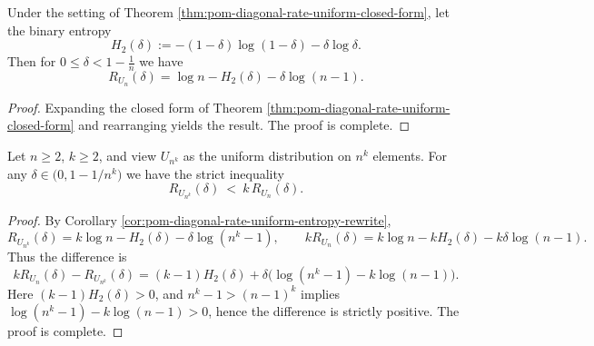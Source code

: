 \begin{corollary}\label{cor:pom-diagonal-rate-uniform-entropy-rewrite}
Under the setting of Theorem \ref{thm:pom-diagonal-rate-uniform-closed-form}, let the binary entropy
\[
H_2(\delta):=-(1-\delta)\log(1-\delta)-\delta\log\delta.
\]
Then for \(0\le\delta<1-\tfrac1n\) we have
\[
R_{U_n}(\delta)=\log n-H_2(\delta)-\delta\log(n-1).
\]
\end{corollary}
\begin{proof}
Expanding the closed form of Theorem \ref{thm:pom-diagonal-rate-uniform-closed-form} and rearranging yields the result. The proof is complete.
\end{proof}

\begin{theorem}\label{thm:pom-diagonal-rate-uniform-synergy-inequality}
Let \(n\ge 2\), \(k\ge 2\), and view \(U_{n^k}\) as the uniform distribution on \(n^k\) elements.
For any \(\delta\in\bigl(0,1-1/n^k\bigr)\) we have the strict inequality
\[
R_{U_{n^k}}(\delta)\ <\ k\,R_{U_n}(\delta).
\]
\end{theorem}
\begin{proof}
By Corollary \ref{cor:pom-diagonal-rate-uniform-entropy-rewrite},
\[
R_{U_{n^k}}(\delta)=k\log n-H_2(\delta)-\delta\log(n^k-1),
\qquad
kR_{U_n}(\delta)=k\log n-kH_2(\delta)-k\delta\log(n-1).
\]
Thus the difference is
\[
kR_{U_n}(\delta)-R_{U_{n^k}}(\delta)
=(k-1)H_2(\delta)+\delta\bigl(\log(n^k-1)-k\log(n-1)\bigr).
\]
Here \((k-1)H_2(\delta)>0\), and \(n^k-1>(n-1)^k\) implies \(\log(n^k-1)-k\log(n-1)>0\), hence the difference is strictly positive. The proof is complete.
\end{proof}

